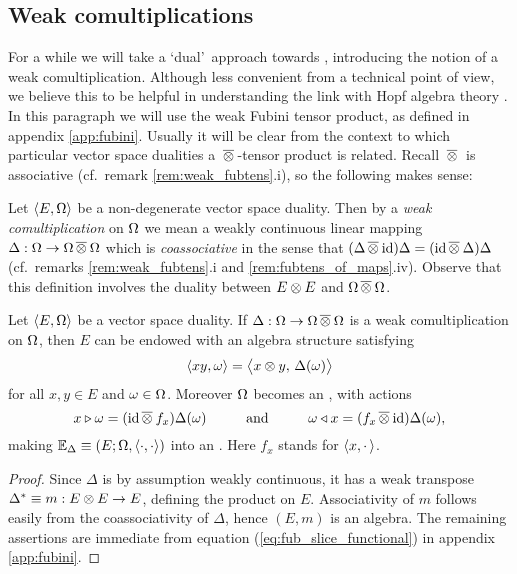 \subsection{Weak comultiplications}
\label{par:comultiplication}

For a while we will take a \lq dual\rq\ approach towards \contexts,
introducing the notion of a weak comultiplication. Although less convenient
from a technical point of view, we believe this to be helpful in
understanding the link with Hopf algebra theory
\cite{Abe,Sweedler,Fons:DPHA,Fons:MHA}\@.
In this paragraph we will use the weak Fubini tensor product,
as defined in appendix \ref{app:fubini}\@. Usually it will be clear from the
context to which particular vector space dualities a $\,\overline{\otimes}\:$-tensor product
is related. Recall $\,\overline{\otimes}\:$ is associative
(cf.\ remark \ref{rem:weak_fubtens}.i), so the following makes sense:

\begin{defn}
  Let $\langle E,\Omega \rangle$ be a non-degenerate vector space duality. Then by a
  {\em weak comultiplication\/} on $\Omega$ we mean a weakly continuous linear mapping
  \mbox{$\Delta: \Omega \rightarrow \Omega \,\overline{\otimes}\: \Omega$} which is {\em coassociative\/} in the sense that
  $ (\Delta \,\overline{\otimes}\: \mbox{\rm id})\Delta  = (\mbox{\rm id} \,\overline{\otimes}\: \Delta)\Delta $
  (cf.\ remarks \ref{rem:weak_fubtens}.i and \ref{rem:fubtens_of_maps}.iv).
  Observe that this definition involves the duality between $E \otimes E$
  and $\Omega \,\overline{\otimes}\: \Omega$.
\end{defn}


\begin{prop} \label{prop:induced_actor_context}
  Let\/ $\langle E,\Omega \rangle$ be a vector space duality.
  If\/ $\Delta: \Omega \rightarrow \Omega \,\overline{\otimes}\: \Omega$ is a weak comultiplication
  on\/ $\Omega$, then $E$ can be endowed with an algebra structure satisfying
  \begin{equation} \label{eq:duality_m_Delta}
    \pair{xy}{\om}=\pairM{x \tens y}{\Delta(\om)}
  \end{equation}
  for all $x,y \in E$ and $\omega \in \Omega$\@.
  Moreover $\Omega$ becomes an \Ebimod, with actions
  \begin{equation} \label{eq:actions_in_terms_of_Delta}
     x \lact \om = (\id \fubtens f_x)\Delta(\om)  \andspace{10mm}
     \om \ract x = (f_x \fubtens \id)\Delta(\om),
  \end{equation}
  making\/ $\mathbb{E}_\Delta \equiv (E; \Omega, \langle\cdot, \cdot\rangle)$ into an \context\@.
  \rm Here $f_x$ stands for $\langle x,\cdot\, \rangle$.
\end{prop}
\begin{proof}
  Since $\Delta$ is by assumption weakly continuous, it has a weak transpose
  $\Delta^* \equiv m : E \otimes E \rightarrow E$, defining the product on $E$.
  Associativity of $m$ follows easily from the coassociativity of $\Delta$,
  hence $(E,m)$ is an algebra. The remaining assertions are immediate from equation
  (\ref{eq:fub_slice_functional}) in appendix \ref{app:fubini}.
\end{proof}



